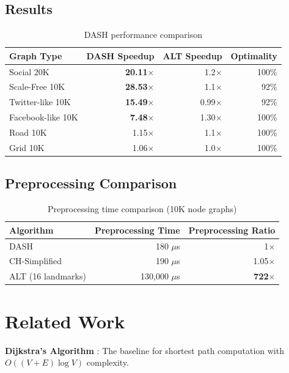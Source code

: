 \documentclass[11pt,a4paper]{article}
\begin{document}
\subsection{Results}

\begin{table}[h]
\centering
\begin{tabular}{lrrr}
\toprule
Graph Type & DASH Speedup & ALT Speedup & Optimality \\
\midrule
Social 20K & \textbf{20.11$\times$} & 1.2$\times$ & 100\% \\
Scale-Free 10K & \textbf{28.53$\times$} & 1.1$\times$ & 92\% \\
Twitter-like 10K & \textbf{15.49$\times$} & 0.99$\times$ & 92\% \\
Facebook-like 10K & \textbf{7.48$\times$} & 1.30$\times$ & 100\% \\
Road 10K & 1.15$\times$ & 1.1$\times$ & 100\% \\
Grid 10K & 1.06$\times$ & 1.0$\times$ & 100\% \\
\bottomrule
\end{tabular}
\caption{DASH performance comparison}
\end{table}

\subsection{Preprocessing Comparison}

\begin{table}[h]
\centering
\begin{tabular}{lrr}
\toprule
Algorithm & Preprocessing Time & Preprocessing Ratio \\
\midrule
DASH & 180 $\mu$s & 1$\times$ \\
CH-Simplified & 190 $\mu$s & 1.05$\times$ \\
ALT (16 landmarks) & 130,000 $\mu$s & \textbf{722$\times$} \\
\bottomrule
\end{tabular}
\caption{Preprocessing time comparison (10K node graphs)}
\end{table}

\section{Related Work}

\textbf{Dijkstra's Algorithm} \cite{dijkstra1959}: The baseline for 
shortest path computation with $O((V+E) \log V)$ complexity.
\end{document}
